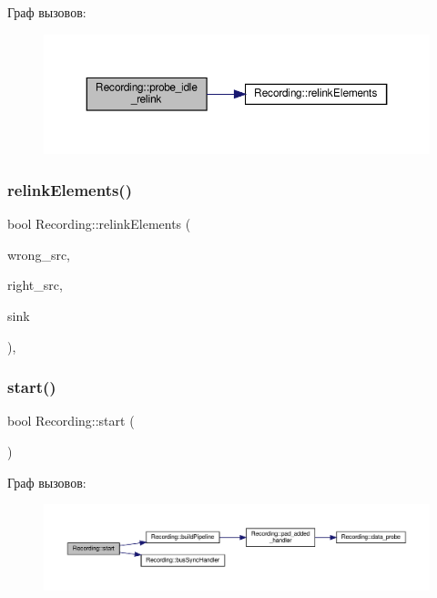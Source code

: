 Граф вызовов\+:\nopagebreak
\begin{figure}[H]
\begin{center}
\leavevmode
\includegraphics[width=350pt]{class_recording_a489e974a8481fdc9b6161c96f59ece8e_cgraph}
\end{center}
\end{figure}
\mbox{\label{class_recording_a8cff139562008be79b2368c4a51d6ffe}} 
\subsubsection{\texorpdfstring{relink\+Elements()}{relinkElements()}}
{\footnotesize\ttfamily bool Recording\+::relink\+Elements (\begin{DoxyParamCaption}\item[{Gst\+Element $\ast$}]{wrong\+\_\+src,  }\item[{Gst\+Element $\ast$}]{right\+\_\+src,  }\item[{Gst\+Element $\ast$}]{sink }\end{DoxyParamCaption})\hspace{0.3cm}{\ttfamily [static]}, {\ttfamily [private]}}

\mbox{\label{class_recording_a6258253b296dfc518b4c64c8f7cb9969}} 
\subsubsection{\texorpdfstring{start()}{start()}}
{\footnotesize\ttfamily bool Recording\+::start (\begin{DoxyParamCaption}{ }\end{DoxyParamCaption})}

Граф вызовов\+:\nopagebreak
\begin{figure}[H]
\begin{center}
\leavevmode
\includegraphics[width=350pt]{class_recording_a6258253b296dfc518b4c64c8f7cb9969_cgraph}
\end{center}
\end{figure}
\mbox{\label{class_recording_a1a53044e56c8a6cf6de62a9c0a7f9ae8}} 
